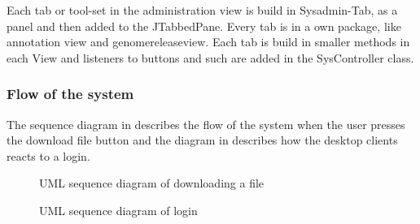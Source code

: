 Each tab or tool-set in the administration view is build in Sysadmin-Tab, as a panel and then added to the JTabbedPane. Every tab is in a own package, like annotation view and genomereleaseview. Each tab is build in smaller methods in each View and listeners to buttons and such are added in the SysController class.


\subsubsection{Flow of the system}

The sequence diagram in  describes the flow of the system when the user presses the download file button and the diagram in  describes how the desktop clients reacts to a login.

\begin{figure}[htb!]
	\caption{UML sequence diagram of downloading a file}
	\label{fig:des_download-sequence}
\end{figure}

\begin{figure}[htb!]
	\caption{UML sequence diagram of login}
	\label{fig:des_login-sequence}
\end{figure}
\FloatBarrier
